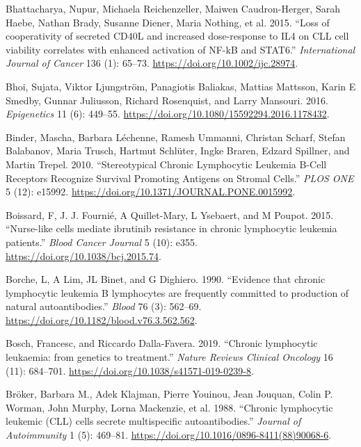 \documentclass[11pt, a4paper, twosided]{book}
\newenvironment{CSLReferences}%
  {}%
  {\par}
\begin{document}
\begin{CSLReferences}{1}{0}
\leavevmode{}%
Bhattacharya, Nupur, Michaela Reichenzeller, Maiwen Caudron-Herger, Sarah Haebe, Nathan Brady, Susanne Diener, Maria Nothing, et al. 2015. {``{Loss of cooperativity of secreted CD40L and increased dose-response to IL4 on CLL cell viability correlates with enhanced activation of NF-kB and STAT6}.''} \emph{International Journal of Cancer} 136 (1): 65--73. \url{https://doi.org/10.1002/ijc.28974}.

\leavevmode{}%
Bhoi, Sujata, Viktor Ljungström, Panagiotis Baliakas, Mattias Mattsson, Karin E Smedby, Gunnar Juliusson, Richard Rosenquist, and Larry Mansouri. 2016. \emph{Epigenetics} 11 (6): 449--55. \url{https://doi.org/10.1080/15592294.2016.1178432}.

\leavevmode{}%
Binder, Mascha, Barbara Léchenne, Ramesh Ummanni, Christan Scharf, Stefan Balabanov, Maria Trusch, Hartmut Schlüter, Ingke Braren, Edzard Spillner, and Martin Trepel. 2010. {``{Stereotypical Chronic Lymphocytic Leukemia B-Cell Receptors Recognize Survival Promoting Antigens on Stromal Cells}.''} \emph{PLOS ONE} 5 (12): e15992. \url{https://doi.org/10.1371/JOURNAL.PONE.0015992}.

\leavevmode{}%
Boissard, F, J. J. Fournié, A Quillet-Mary, L Ysebaert, and M Poupot. 2015. {``{Nurse-like cells mediate ibrutinib resistance in chronic lymphocytic leukemia patients}.''} \emph{Blood Cancer Journal} 5 (10): e355. \url{https://doi.org/10.1038/bcj.2015.74}.

\leavevmode{}%
Borche, L, A Lim, JL Binet, and G Dighiero. 1990. {``{Evidence that chronic lymphocytic leukemia B lymphocytes are frequently committed to production of natural autoantibodies}.''} \emph{Blood} 76 (3): 562--69. \url{https://doi.org/10.1182/blood.v76.3.562.562}.

\leavevmode{}%
Bosch, Francesc, and Riccardo Dalla-Favera. 2019. {``{Chronic lymphocytic leukaemia: from genetics to treatment}.''} \emph{Nature Reviews Clinical Oncology} 16 (11): 684--701. \url{https://doi.org/10.1038/s41571-019-0239-8}.

\leavevmode{}%
Bröker, Barbara M., Adek Klajman, Pierre Youinou, Jean Jouquan, Colin P. Worman, John Murphy, Lorna Mackenzie, et al. 1988. {``{Chronic lymphocytic leukemic (CLL) cells secrete multispecific autoantibodies}.''} \emph{Journal of Autoimmunity} 1 (5): 469--81. \url{https://doi.org/10.1016/0896-8411(88)90068-6}.


\end{CSLReferences}
\end{document}
